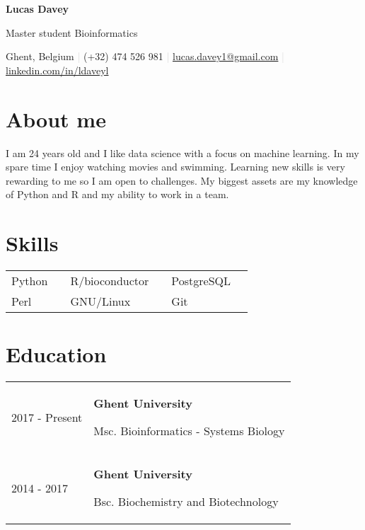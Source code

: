 \documentclass{article}
\makeatletter
\renewcommand{\maketitle}{
\begin{flushleft}
    {\HUGE\bfseries{Lucas} \bfseries{Davey}}

    \vspace{.25em}
    
    Master student Bioinformatics
    
    \vspace{.25em}
    
    \small{\faHome \hspace{.1em} Ghent, Belgium \hspace{.25em} \textcolor{lightgrey}{|} \hspace{.25em} \faMobile \hspace{.1em} (+32) 474 526 981 \hspace{.25em} \textcolor{lightgrey}{|}  
    \hspace{.25em} \faEnvelope \hspace{.1em} \href{mailto:lucas.davey1@gmail.com}{lucas.davey1@gmail.com} \hspace{.25em} \textcolor{lightgrey}{|} \hspace{.25em} \textcolor{linkedinblue}{\faLinkedinSquare} \hspace{.1em} \href{https://www.linkedin.com/in/ldaveyl}{linkedin.com/in/ldaveyl}}
\end{flushleft}
}
\makeatother
\begin{document}
\maketitle

\section{About me}
I am 24 years old and I like data science with a focus on machine learning. In my spare time I enjoy watching movies and swimming.
Learning new skills is very rewarding to me so I am open to challenges.
My biggest assets are my knowledge of Python and R and my ability to work in a team. 

\section{Skills}
\setlength\extrarowheight{10pt}
\begin{tabular}{ m{2.5cm} m{1cm} m{2.5cm} m{1cm} m{2.5cm} m{1cm}}
    Python & & R/bioconductor & & PostgreSQL & \\ 
    Perl & & GNU/Linux & & Git\\
\end{tabular}

\section{Education}
\begin{tabular}{ p{2.3cm} p{12cm} }
    2017 - Present & \textbf{Ghent University}

    Msc. Bioinformatics - Systems Biology \\

    2014 - 2017 & \textbf{Ghent University}
    
    Bsc. Biochemistry and Biotechnology \\
\end{tabular}
\end{document}
